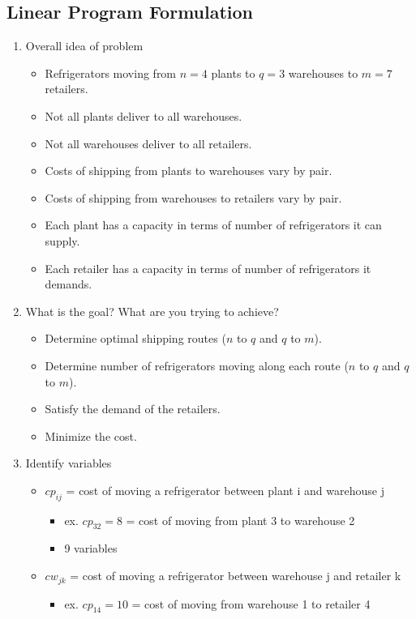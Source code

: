 \documentclass[../report/main.tex]{subfiles}
\begin{document}
\subsection*{Linear Program Formulation}
\begin{enumerate}[1.]
	\item Overall idea of problem
	\begin{itemize}
		\item Refrigerators moving from $n=4$ plants to $q=3$ warehouses to $m=7$ retailers.
		\item Not all plants deliver to all warehouses.
		\item Not all warehouses deliver to all retailers.
		\item Costs of shipping from plants to warehouses vary by pair.
		\item Costs of shipping from warehouses to retailers vary by pair.
		\item Each plant has a capacity in terms of number of refrigerators it can supply.
		\item Each retailer has a capacity in terms of number of refrigerators it demands.
	\end{itemize}
	\item What is the goal?  What are you trying to achieve?
	\begin{itemize}
		\item Determine optimal shipping routes ($n$ to $q$ and $q$ to $m$).
		\item Determine number of refrigerators moving along each route ($n$ to $q$ and $q$ to $m$).
		\item Satisfy the demand of the retailers.
		\item Minimize the cost.
	\end{itemize}
	\item Identify variables
	\begin{itemize}
		\item $cp_{ij}$ = cost of moving a refrigerator between plant i and warehouse j
		\begin{itemize}
			\item   ex. $cp_{32} = 8$ = cost of moving from plant 3 to warehouse 2
			\item   9 variables
		\end{itemize}
		\item $cw_{jk}$ = cost of moving a refrigerator between warehouse j and retailer k
		\begin{itemize}
  			\item  ex. $cp_{14} = 10$ = cost of moving from warehouse 1 to retailer 4

\end{itemize}
\end{itemize}
\end{enumerate}
\end{document}
